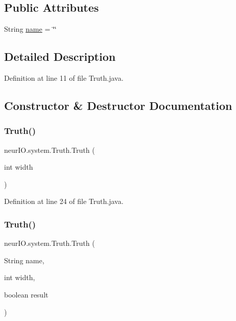 \subsection*{Public Attributes}
\begin{DoxyCompactItemize}
\item 
String \hyperlink{classneur_i_o_1_1system_1_1_truth_a73e0e02b8591832131d0c26d1f88dea2}{name} = \char`\"{}\char`\"{}
\end{DoxyCompactItemize}


\subsection{Detailed Description}


Definition at line 11 of file Truth.\+java.



\subsection{Constructor \& Destructor Documentation}
\mbox{\label{classneur_i_o_1_1system_1_1_truth_a097cc75403bc8483160fb5668f0fd039}} 
\subsubsection{\texorpdfstring{Truth()}{Truth()}\hspace{0.1cm}{\footnotesize\ttfamily [1/5]}}
{\footnotesize\ttfamily neur\+I\+O.\+system.\+Truth.\+Truth (\begin{DoxyParamCaption}\item[{int}]{width }\end{DoxyParamCaption})}



Definition at line 24 of file Truth.\+java.

\mbox{\label{classneur_i_o_1_1system_1_1_truth_a448eb40dceba7515b95ad0c408ac9dc0}} 
\subsubsection{\texorpdfstring{Truth()}{Truth()}\hspace{0.1cm}{\footnotesize\ttfamily [2/5]}}
{\footnotesize\ttfamily neur\+I\+O.\+system.\+Truth.\+Truth (\begin{DoxyParamCaption}\item[{String}]{name,  }\item[{int}]{width,  }\item[{boolean}]{result }\end{DoxyParamCaption})}



